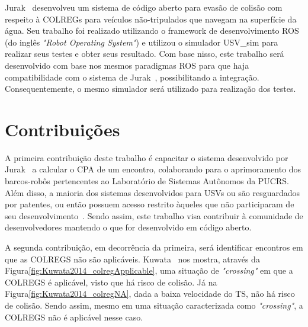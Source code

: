         Jurak~\cite{JURAK2020} desenvolveu um sistema de código aberto para evasão de colisão com respeito à COLREGs para veículos não-tripulados que navegam na superfície da água. Seu trabalho foi realizado utilizando o framework de desenvolvimento ROS (do inglês \textit{"Robot Operating System"}) e utilizou o simulador USV\_sim para realizar seus testes e obter seus resultado. Com base nisso, este trabalho será desenvolvido com base nos mesmos paradigmas ROS para que haja compatibilidade com o sistema de Jurak~\cite{JURAK2020}, possibilitando a integração. Consequentemente, o mesmo simulador será utilizado para realização dos testes.
        
    \section{Contribuições}\label{subchap1:contrib}
        A primeira contribuição deste trabalho é capacitar o sistema desenvolvido por Jurak~\cite{JURAK2020} a calcular o CPA de um encontro, colaborando para o aprimoramento dos barcos-robôs pertencentes ao Laboratório de Sistemas Autônomos da PUCRS. Além disso, a maioria dos sistemas desenvolvidos para USVs ou são resguardados por patentes, ou então possuem acesso restrito àqueles que não participaram de seu desenvolvimento~\cite{JURAK2020}. Sendo assim, este trabalho visa contribuir à comunidade de desenvolvedores mantendo o que for desenvolvido em código aberto.
        
        A segunda contribuição, em decorrência da primeira, será identificar encontros em que as COLREGS não são aplicáveis. Kuwata \etal~nos mostra, através da Figura\ref{fig:Kuwata2014_colregApplicable}, uma situação de \textit{"crossing"} em que a COLREGS é aplicável, visto que há risco de colisão. Já na Figura\ref{fig:Kuwata2014_colregNA}, dada a baixa velocidade do TS, não há risco de colisão. Sendo assim, mesmo em uma situação caracterizada como \textit{"crossing"}, a COLREGS não é aplicável nesse caso.

